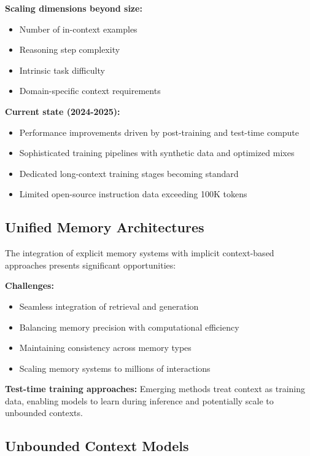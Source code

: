 \documentclass[11pt]{article}
\begin{document}
\textbf{Scaling dimensions beyond size:}
\begin{itemize}[leftmargin=*]
    \item Number of in-context examples
    \item Reasoning step complexity
    \item Intrinsic task difficulty
    \item Domain-specific context requirements
\end{itemize}

\textbf{Current state (2024-2025):}
\begin{itemize}[leftmargin=*]
    \item Performance improvements driven by post-training and test-time compute
    \item Sophisticated training pipelines with synthetic data and optimized mixes
    \item Dedicated long-context training stages becoming standard
    \item Limited open-source instruction data exceeding 100K tokens
\end{itemize}

\subsection{Unified Memory Architectures}

The integration of explicit memory systems with implicit context-based approaches presents significant opportunities:

\textbf{Challenges:}
\begin{itemize}[leftmargin=*]
    \item Seamless integration of retrieval and generation
    \item Balancing memory precision with computational efficiency
    \item Maintaining consistency across memory types
    \item Scaling memory systems to millions of interactions
\end{itemize}

\textbf{Test-time training approaches:}
Emerging methods treat context as training data, enabling models to learn during inference and potentially scale to unbounded contexts.

\subsection{Unbounded Context Models}
\end{document}
